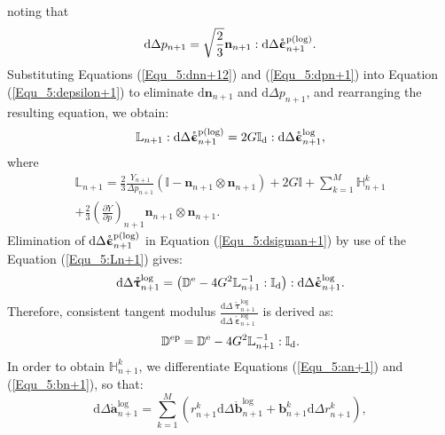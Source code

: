 noting that
\begin{equation}
\label{Equ_5:dpn+1}
{\text{d}}\Delta {p_{n + 1}} = \sqrt {\frac{2}{3}} {{\mathbf{n}}_{n + 1}}:{\text{d}}\Delta \mathring {\bm{\upepsilon}}_{n + 1}^{\rm p(\log) }.
\end{equation}
Substituting Equations (\ref{Equ_5:dnn+12}) and (\ref{Equ_5:dpn+1}) into Equation (\ref{Equ_5:depsilon+1}) to eliminate ${\text{d}}{{\mathbf{n}}_{n + 1}}$ and ${\text{d}}\Delta {p_{n + 1}}$, and rearranging the resulting equation, we obtain:
\begin{equation}
{\mathbb{L}_{n + 1}}:{\text{d}}\Delta \mathring {\bm{\upepsilon}}_{n + 1}^{\rm p(\log) } = 2G{\mathbb{I}_{\rm d}}:{\text{d}}\Delta \mathring {\bm{\upepsilon}}_{n + 1}^{\log },
\end{equation}
where
\begin{equation}
\label{Equ_5:Ln+1}
\begin{aligned}
\mathbb{L}_{n + 1} = \frac{2}{3}\frac{Y_{n + 1}}{\Delta {p_{n + 1}}} \left( \mathbb{I} - \mathbf{n}_{n + 1} \otimes \mathbf{n}_{n + 1} \right) + 2G\mathbb{I} + \sum \limits_{k = 1}^M {\mathbb{H}_{n + 1}^k} \\
   + \frac{2}{3}{{\left( {\frac{{\partial Y}}{{\partial p}}} \right)}_{n + 1}}{{\mathbf{n}}_{n + 1}} \otimes {{\mathbf{n}}_{n + 1}}.
\end{aligned}
\end{equation}
Elimination of ${\text{d}}\Delta \mathring {\bm{\upepsilon}}_{n + 1}^{\rm p(\log) }$ in Equation (\ref{Equ_5:dsigman+1}) by use of the Equation (\ref{Equ_5:Ln+1}) gives:
\begin{equation}
{\text{d}}\Delta \mathring {\bm{\uptau}}_{n + 1}^{\log } = \left( {{\mathbb{D}^{\rm{e}}} - 4{G^2}\mathbb{L}_{n + 1}^{ - 1}:{\mathbb{I}_{\rm d}}} \right):{\text{d}}\Delta \mathring {\bm{\upepsilon}}_{n + 1}^{\log }.
\end{equation}
Therefore, consistent tangent modulus $\frac{{\text{d}}\Delta \mathring {\bm{\uptau}}_{n + 1}^{\log }}{{\text{d}}\Delta \mathring {\bm{\upepsilon}}_{n + 1}^{\log }}$ is derived as:
\begin{equation}
{\mathbb{D}^{\rm{ep}}} = {\mathbb{D}^{\rm{e}}} - 4{G^2}\mathbb{L}_{n + 1}^{ - 1}:{\mathbb{I}_{\rm d}}.
\end{equation}
In order to obtain $\mathbb{H}_{n + 1}^k$, we differentiate Equations (\ref{Equ_5:an+1}) and (\ref{Equ_5:bn+1}), so that:
\begin{equation}
\text{d} \Delta \mathring {\mathbf{a}}_{n + 1}^{\log } = \sum\limits_{k = 1}^M {\left( {r_{n + 1}^k\text{d} \Delta \mathring {\mathbf{b}}_{n + 1}^{\log } + {\mathbf{b}}_{n + 1}^k{\text{d}} \Delta r_{n + 1}^k} \right)},
\end{equation}
